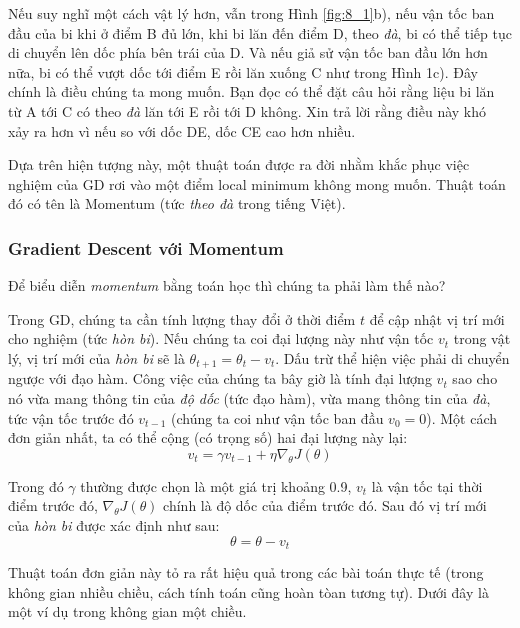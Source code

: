 Nếu suy nghĩ một cách vật lý hơn, vẫn trong Hình \ref{fig:8_1}b), nếu vận tốc ban đầu của bi khi ở điểm B đủ lớn, khi bi lăn đến điểm D, theo \textit{đà}, bi có thể tiếp tục di chuyển lên dốc phía bên trái của D. Và nếu giả sử vận tốc ban đầu lớn hơn nữa, bi có thể vượt dốc tới điểm E rồi lăn xuống C như trong Hình 1c). Đây chính là điều chúng ta mong muốn. Bạn đọc có thể đặt câu hỏi rằng liệu bi lăn từ A tới C có theo \textit{đà} lăn tới E rồi tới D không. Xin trả lời rằng điều này khó xảy ra hơn vì nếu so với dốc DE, dốc CE cao hơn nhiều. 
 
Dựa trên hiện tượng này, một thuật toán được ra đời nhằm khắc phục việc nghiệm của GD rơi vào một điểm local minimum không mong muốn. Thuật toán đó có tên là Momentum (tức \textit{theo đà} trong tiếng Việt). 
 
 
\subsubsection{Gradient Descent với Momentum}
Để biểu diễn \textit{momentum} bằng toán học thì chúng ta phải làm thế nào? 
 
Trong GD, chúng ta cần tính lượng thay đổi ở thời điểm $t$ để cập nhật vị trí mới cho nghiệm (tức \textit{hòn bi}). Nếu chúng ta coi đại lượng này như vận tốc $v_t$ trong vật lý, vị trí mới của \textit{hòn bi} sẽ là $\theta_{t+1} = \theta_{t} - v_t$. Dấu trừ thể hiện việc phải di chuyển ngược với đạo hàm. Công việc của chúng ta bây giờ là tính đại lượng $v_t$ sao cho nó vừa mang thông tin của \textit{độ dốc} (tức đạo hàm), vừa mang thông tin của \textit{đà}, tức vận tốc trước đó $v_{t-1}$ (chúng ta coi như vận tốc ban đầu $v_0=0$). Một cách đơn giản nhất, ta có thể cộng (có trọng số) hai đại lượng này lại: 
\begin{equation} 
v_{t}= \gamma v_{t-1} + \eta \nabla_{\theta}J(\theta) 
\end{equation} 
 
Trong đó $\gamma$ thường được chọn là một giá trị khoảng 0.9, $v_t$ là vận tốc tại thời điểm trước đó, $ \nabla_{\theta}J(\theta)$ chính là độ dốc của điểm trước đó.  
Sau đó vị trí mới của \textit{hòn bi} được xác định như sau: 
\begin{equation} 
\theta = \theta - v_t 
\end{equation} 
 
Thuật toán đơn giản này tỏ ra rất hiệu quả trong các bài toán thực tế (trong không gian nhiều chiều, cách tính toán cũng hoàn tòan tương tự). Dưới đây là một ví dụ trong không gian một chiều. 
 
